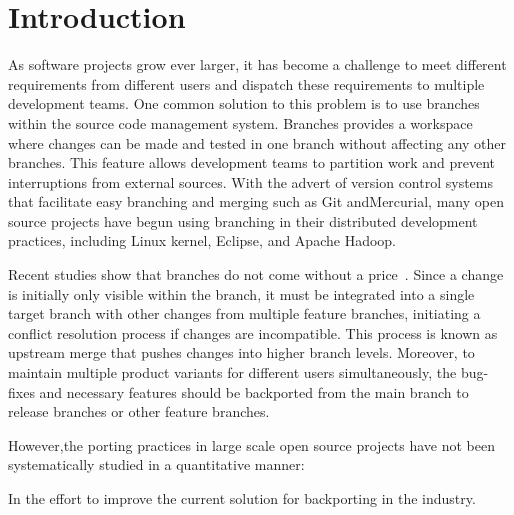 \section{Introduction}

As software projects grow ever larger, it has become a challenge to meet different requirements from different users and dispatch these requirements to multiple development teams.   One common solution to this problem is to use branches within the source code management system. Branches  provides a workspace where changes can be made and tested in one branch without affecting any other branches.  This feature allows development teams to partition work and prevent interruptions from external sources. With the advert of version control systems that facilitate easy branching and merging such as Git andMercurial, many open source projects have begun using branching in their distributed development practices, including Linux kernel, Eclipse, and Apache Hadoop. 

Recent studies show that branches do not come without a price~\cite{Muslu:dvcsICSE14, Bird:whatIfFSE12}. Since a change is initially only visible within the branch, it must be integrated into a single target branch with other changes from multiple feature branches, initiating a conflict resolution process if changes are incompatible. This process is known as upstream merge that pushes changes into higher  branch levels. Moreover,  to maintain multiple product variants for different users simultaneously, the bug-fixes and necessary features should be backported from the main branch to release branches or other feature branches.  

However,the porting practices in large scale open source projects have not been systematically studied in a quantitative manner: 

 In the effort to improve the current solution for backporting in the industry. 